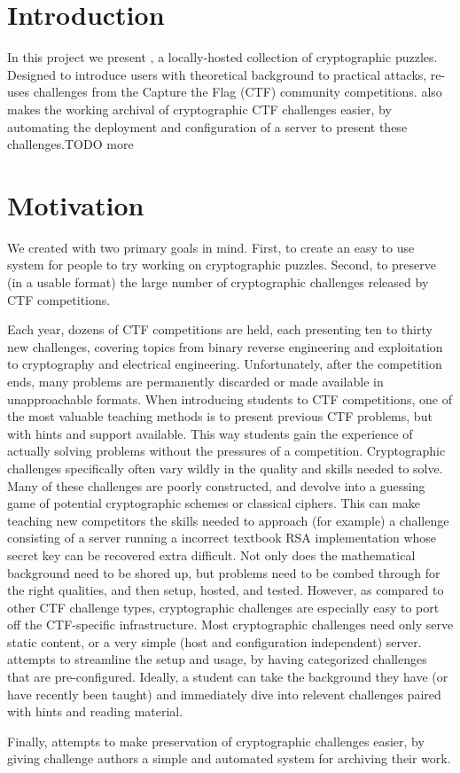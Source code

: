 \section{Introduction}
In this project we present \cvm{}, a locally-hosted collection of
cryptographic puzzles. Designed to introduce users with theoretical
background to practical attacks, \cvm{} re-uses challenges from the
Capture the Flag (CTF) community competitions. \cvm{} also makes the
working archival of cryptographic CTF challenges easier, by automating
the deployment and configuration of a server to present these
challenges.TODO more


\section{Motivation}
We created \cvm{} with two primary goals in mind. First, to create an
easy to use system for people to try working on cryptographic
puzzles. Second, to preserve (in a usable format) the large number of
cryptographic challenges released by CTF competitions.

Each year, dozens of CTF competitions are held, each presenting ten to
thirty new challenges, covering topics from binary reverse engineering
and exploitation to cryptography and electrical
engineering. Unfortunately, after the competition ends, many problems
are permanently discarded or made available in unapproachable
formats. When introducing students to CTF competitions, one of the
most valuable teaching methods is to present previous CTF problems,
but with hints and support available. This way students gain the
experience of actually solving problems without the pressures of a
competition. Cryptographic challenges specifically often vary wildly
in the quality and skills needed to solve. Many of these challenges
are poorly constructed, and devolve into a guessing game of potential
cryptographic schemes or classical ciphers. This can make teaching new
competitors the skills needed to approach (for example) a challenge
consisting of a server running a incorrect textbook RSA implementation
whose secret key can be recovered extra difficult. Not only does the
mathematical background need to be shored up, but problems need to be
combed through for the right qualities, and then setup, hosted, and
tested. However, as compared to other CTF challenge types,
cryptographic challenges are especially easy to port off the
CTF-specific infrastructure. Most cryptographic challenges need only
serve static content, or a very simple (host and configuration
independent) server. \cvm{} attempts to streamline the setup and
usage, by having categorized challenges that are
pre-configured. Ideally, a student can take the background they have
(or have recently been taught) and immediately dive into relevent
challenges paired with hints and reading material.

Finally, \cvm{} attempts to make preservation of cryptographic
challenges easier, by giving challenge authors a simple and automated
system for archiving their work.
